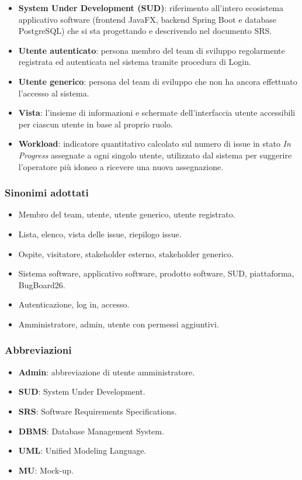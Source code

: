 \documentclass[a4paper,12pt]{article}
\begin{document}
\begin{itemize}
    \item \textbf{System Under Development (SUD)}: riferimento all'intero ecosistema applicativo software (frontend JavaFX, backend Spring Boot e database PostgreSQL) che si sta progettando e descrivendo nel documento SRS.

    \item \textbf{Utente autenticato}: persona membro del team di sviluppo regolarmente registrata ed autenticata nel sistema tramite procedura di Login.

    \item \textbf{Utente generico}: persona del team di sviluppo che non ha ancora effettuato l'accesso al sistema.

    \item \textbf{Vista}: l'insieme di informazioni e schermate dell'interfaccia utente accessibili per ciascun utente in base al proprio ruolo.

    \item \textbf{Workload}: indicatore quantitativo calcolato sul numero di issue in stato \textit{In Progress} assegnate a ogni singolo utente, utilizzato dal sistema per suggerire l'operatore più idoneo a ricevere una nuova assegnazione. 
\end{itemize}

\subsubsection{Sinonimi adottati}
\begin{itemize}
    \item Membro del team, utente, utente generico, utente registrato.
    \item Lista, elenco, vista delle issue, riepilogo issue.
    \item Ospite, visitatore, stakeholder esterno, stakeholder generico.
    \item Sistema software, applicativo software, prodotto software, SUD, piattaforma, BugBoard26.
    \item Autenticazione, log in, accesso.
    \item Amministratore, admin, utente con permessi aggiuntivi.
\end{itemize}

\subsubsection{Abbreviazioni}
\begin{itemize}
    \item \textbf{Admin}: abbreviazione di utente amministratore.
    \item \textbf{SUD}: System Under Development.
    \item \textbf{SRS}: Software Requirements Specifications.
    \item \textbf{DBMS}: Database Management System.
    \item \textbf{UML}: Unified Modeling Language.
    \item \textbf{MU}: Mock-up.
\end{itemize}
\end{document}
